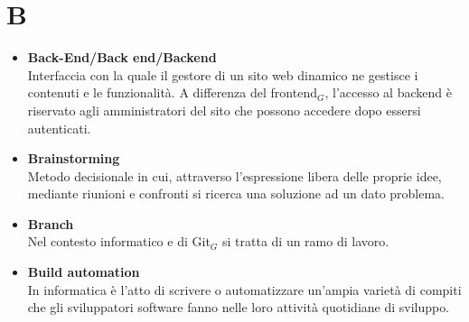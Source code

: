 \chapter{B} \label{B}
\begin{itemize}
	\item \textbf{Back-End/Back end/Backend} \\
	Interfaccia con la quale il gestore di un sito web dinamico ne gestisce i contenuti e le funzionalità. A differenza del frontend$_G$, l'accesso al backend è riservato agli amministratori del sito che possono accedere dopo essersi autenticati.
	
	\item \textbf{Brainstorming} \\
	Metodo decisionale in cui, attraverso l’espressione libera delle proprie idee, mediante riunioni e confronti si ricerca una soluzione ad un dato problema.
	
	\item \textbf{Branch} \\
	Nel contesto informatico e di Git$_G$ si tratta di un ramo di lavoro.
	
	\item \textbf{Build automation} \\
	In informatica è l'atto di scrivere o automatizzare un'ampia varietà di compiti che gli sviluppatori software fanno nelle loro attività quotidiane di sviluppo.
\end{itemize}